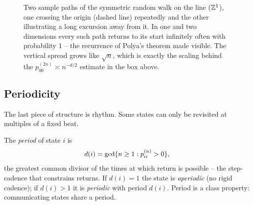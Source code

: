 \begin{figure}[H]
\centering
{}
\caption{Two sample paths of the symmetric random walk on the line ($\mathbb{Z}^1$), one crossing the origin (dashed line) repeatedly and the other illustrating a long excursion away from it. In one and two dimensions every such path returns to its
start infinitely often with probability $1$ -- the recurrence of Polya's theorem made visible.
The vertical spread grows like $\sqrt{n}$, which is exactly the scaling behind the
$p_{00}^{(2n)} \asymp n^{-d/2}$ estimate in the box above.}
\label{ch23:fig-rw-paths}
\end{figure}

\subsection{Periodicity}

The last piece of structure is rhythm. Some states can only be revisited at multiples of a
fixed beat.

\begin{definition}[Period]
\label{ch23:def-period}
The \emph{period} of state $i$ is
\[
  d(i) = \gcd\{ n \ge 1 : p_{ii}^{(n)} > 0 \},
\]
the greatest common divisor of the times at which return is possible -- the
step-cadence that constrains returns. If $d(i) = 1$ the state
is \emph{aperiodic} (no rigid cadence); if $d(i) > 1$ it is \emph{periodic} with period $d(i)$.
Period is a class property: communicating states share a period.
\end{definition}

